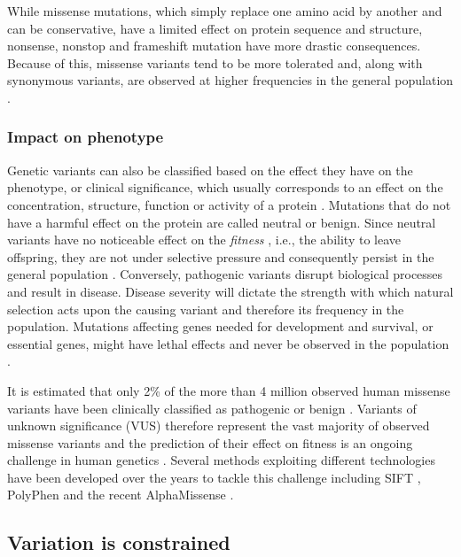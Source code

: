 While missense mutations, which simply replace one amino acid by another and can be conservative, have a limited effect on protein sequence and structure, nonsense, nonstop and frameshift mutation have more drastic consequences. Because of this, missense variants tend to be more tolerated and, along with synonymous variants, are observed at higher frequencies in the general population \cite{COULTER_2004_MUTATIONS}.

\subsubsection{Impact on phenotype}

Genetic variants can also be classified based on the effect they have on the phenotype, or clinical significance, which usually corresponds to an effect on the concentration, structure, function or activity of a protein \cite{VIHINEN_2022_VARIATION}. Mutations that do not have a harmful effect on the protein are called neutral or benign. Since neutral variants have no noticeable effect on the \textit{fitness} \cite{DARWIN_1859_ORIGIN}, i.e., the ability to leave offspring, they are not under selective pressure and consequently persist in the general population \cite{KIMURA_1968_NEUTRAL}. Conversely, pathogenic variants disrupt biological processes and result in disease. Disease severity will dictate the strength with which natural selection acts upon the causing variant and therefore its frequency in the population. Mutations affecting genes needed for development and survival, or essential genes, might have lethal effects and never be observed in the population \cite{GLUECKSOHN_1963_LETHALITY}.

It is estimated that only 2\% of the more than 4 million observed human missense variants have been clinically classified as pathogenic or benign \cite{LEK_2016_EXAC}. Variants of unknown significance (VUS) therefore represent the vast majority of observed missense variants and the prediction of their effect on fitness is an ongoing challenge in human genetics \cite{MCLAREN_2016_VEP}. Several methods exploiting different technologies have been developed over the years to tackle this challenge including SIFT \cite{KUMAR_2009_SIFT}, PolyPhen \cite{ADZHUBEI_2013_POLYPHEN} and the recent AlphaMissense \cite{CHENG_2023_ALPHAMISSENSE}.

\subsection{Variation is constrained}

